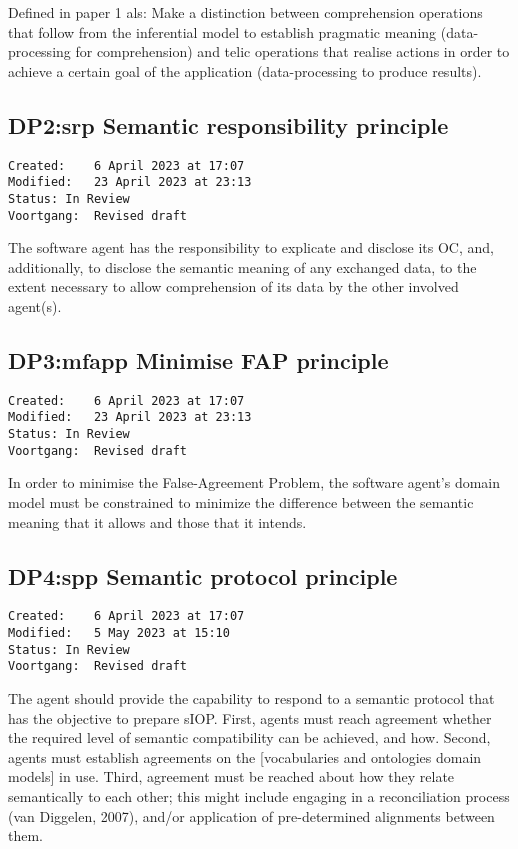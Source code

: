 \documentclass[sort&compress,preprint,3p,authoryear,twocolumn]{elsarticle}
\theoremstyle{break}			%
\begin{document}
Defined in paper 1 als: Make a distinction between comprehension
operations that follow from the inferential model to establish pragmatic
meaning (data-processing for comprehension) and telic operations that
realise actions in order to achieve a certain goal of the application
(data-processing to produce results).

\subsection{DP2:srp Semantic responsibility
principle}\label{dp2srp-semantic-responsibility-principle}

\begin{verbatim}
Created:    6 April 2023 at 17:07
Modified:   23 April 2023 at 23:13
Status: In Review
Voortgang:  Revised draft
\end{verbatim}

The software agent has the responsibility to explicate and disclose its
OC, and, additionally, to disclose the semantic meaning of any exchanged
data, to the extent necessary to allow comprehension of its data by the
other involved agent(s).

\subsection{DP3:mfapp Minimise FAP
principle}\label{dp3mfapp-minimise-fap-principle}

\begin{verbatim}
Created:    6 April 2023 at 17:07
Modified:   23 April 2023 at 23:13
Status: In Review
Voortgang:  Revised draft
\end{verbatim}

In order to minimise the False-Agreement Problem, the software agent's
domain model must be constrained to minimize the difference between the
semantic meaning that it allows and those that it intends.

\subsection{DP4:spp Semantic protocol
principle}\label{dp4spp-semantic-protocol-principle}

\begin{verbatim}
Created:    6 April 2023 at 17:07
Modified:   5 May 2023 at 15:10
Status: In Review
Voortgang:  Revised draft
\end{verbatim}

The agent should provide the capability to respond to a semantic
protocol that has the objective to prepare sIOP. First, agents must
reach agreement whether the required level of semantic compatibility can
be achieved, and how. Second, agents must establish agreements on the
{[}vocabularies and ontologies \textbar{} domain models{]} in use.
Third, agreement must be reached about how they relate semantically to
each other; this might include engaging in a reconciliation process (van
Diggelen, 2007), and/or application of pre-determined alignments between
them.
\end{document}
